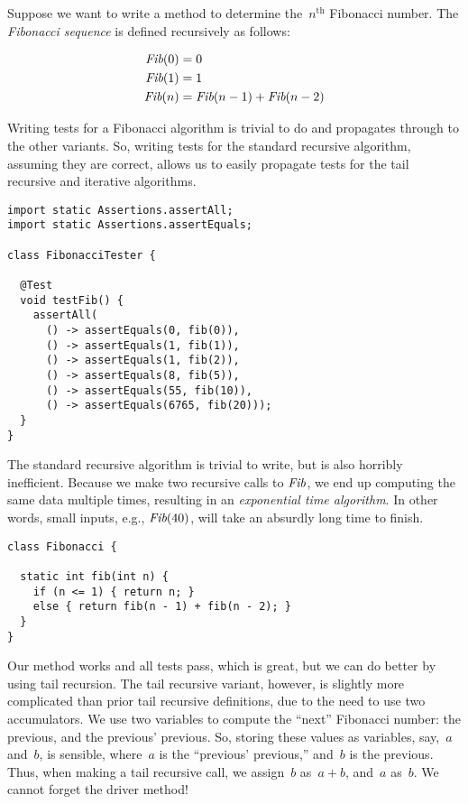 Suppose we want to write a method to determine the~$n^\text{th}$ Fibonacci number. 
The \emph{Fibonacci sequence} is defined recursively as follows:

\begin{align*}
  \emph{Fib}(0) &= 0\\
  \emph{Fib}(1) &= 1\\
  \emph{Fib}(n) &= \emph{Fib}(n - 1) + \emph{Fib}(n - 2)
\end{align*}

Writing tests for a Fibonacci algorithm is trivial to do and propagates through to the other variants. 
So, writing tests for the standard recursive algorithm, assuming they are correct, allows us to easily propagate tests for the tail recursive and iterative algorithms.

\begin{lstlisting}[language=MyJava]
import static Assertions.assertAll;
import static Assertions.assertEquals;

class FibonacciTester {

  @Test
  void testFib() {
    assertAll(
      () -> assertEquals(0, fib(0)),
      () -> assertEquals(1, fib(1)),
      () -> assertEquals(1, fib(2)),
      () -> assertEquals(8, fib(5)),
      () -> assertEquals(55, fib(10)),
      () -> assertEquals(6765, fib(20)));
  }
}
\end{lstlisting}

The standard recursive algorithm is trivial to write, but is also horribly inefficient. 
Because we make two recursive calls to $\emph{Fib}$, we end up computing the same data multiple times, resulting in an \emph{exponential time algorithm}. 
In other words, small inputs, e.g., $\emph{Fib}(40)$, will take an absurdly long time to finish.

\begin{lstlisting}[language=MyJava]
class Fibonacci {

  static int fib(int n) {
    if (n <= 1) { return n; } 
    else { return fib(n - 1) + fib(n - 2); }
  }
}
\end{lstlisting}

Our method works and all tests pass, which is great, but we can do better by using tail recursion. 
The tail recursive variant, however, is slightly more complicated than prior tail recursive definitions, due to the need to use two accumulators. 
We use two variables to compute the ``next'' Fibonacci number: the previous, and the previous' previous. 
So, storing these values as variables, say,~$a$ and~$b$, is sensible, where~$a$ is the ``previous' previous,'' and~$b$ is the previous. 
Thus, when making a tail recursive call, we assign~$b$ as~$a + b$, and~$a$ as~$b$. 
We cannot forget the driver method!


